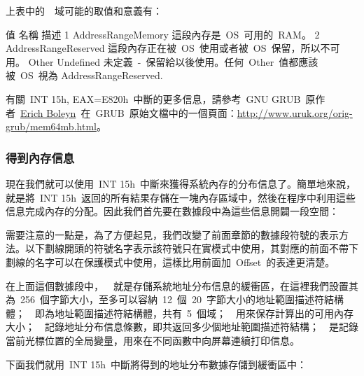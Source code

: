 上表中的~~域可能的取值和意義有：
\begin{Command}
值      名稱                     描述
1       AddressRangeMemory      這段內存是~OS~可用的~RAM。
2       AddressRangeReserved    這段內存正在被~OS~使用或者被~OS~保留，所以不可用。
Other   Undefined               未定義~-~保留給以後使用。任何~Other~值都應該被~OS~視為                                          AddressRangeReserved.
\end{Command}

有關~INT 15h, EAX=E820h~中斷的更多信息，請參考~GNU GRUB~原作者~\href{http://www.uruk.org/~erich/}{Erich Boleyn}~在~GRUB~原始文檔中的一個頁面：\url{http://www.uruk.org/orig-grub/mem64mb.html}。

\subsubsection{得到內存信息}

現在我們就可以使用~INT 15h~中斷來獲得系統內存的分布信息了。簡單地來說，就是將~INT 15h~返回的所有結果存儲在一塊內存區域中，然後在程序中利用這些信息完成內存的分配。因此我們首先要在數據段中為這些信息開闢一段空間：


需要注意的一點是，為了方便起見，我們改變了前面章節的數據段符號的表示方法。以下劃線開頭的符號名字表示該符號只在實模式中使用，其對應的前面不帶下劃線的名字可以在保護模式中使用，這樣比用前面加~Offset~的表達更清楚。

在上面這個數據段中，~~就是存儲系統地址分布信息的緩衝區，在這裡我們設置其為~256~個字節大小，至多可以容納~12~個~20~字節大小的地址範圍描述符結構體；~~即為地址範圍描述符結構體，共有~5~個域；~~用來保存計算出的可用內存大小；~~記錄地址分布信息條數，即共返回多少個地址範圍描述符結構；~~是記錄當前光標位置的全局變量，用來在不同函數中向屏幕連續打印信息。

下面我們就用~INT 15h~中斷將得到的地址分布數據存儲到緩衝區中：


